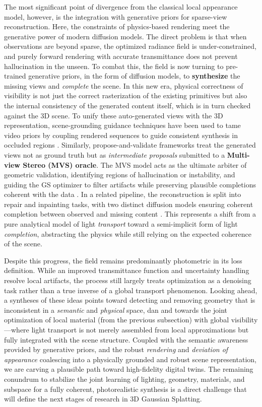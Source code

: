 \documentclass[11pt,a4paper]{article}
\begin{document}
The most significant point of divergence from the classical local appearance model, however, is the integration with generative priors for sparse-view reconstruction. Here, the constraints of physics-based rendering meet the generative power of modern diffusion models. The direct problem is that when observations are beyond sparse, the optimized radiance field is under-constrained, and purely forward rendering with accurate transmittance does not prevent hallucination in the unseen. To combat this, the field is now turning to pre-trained generative priors, in the form of diffusion models, to \textbf{synthesize} the missing views and \emph{complete} the scene. In this new era, physical correctness of visibility is not just the correct rasterization of the existing primitives but also the internal consistency of the generated content itself, which is in turn checked against the 3D scene. To unify these auto-generated views with the 3D representation, scene-grounding guidance techniques have been used to tame video priors by coupling rendered sequences to guide consistent synthesis in occluded regions \cite{arxiv:2503.05082v1}. Similarly, propose-and-validate frameworks treat the generated views not as ground truth but as \emph{intermediate proposals} submitted to a \textbf{Multi-view Stereo (MVS) oracle}. The MVS model acts as the ultimate arbiter of geometric validation, identifying regions of hallucination or instability, and guiding the GS optimizer to filter artifacts while preserving plausible completions coherent with the data \cite{arxiv:2509.23258v2}. In a related pipeline, the reconstruction is split into repair and inpainting tasks, with two distinct diffusion models ensuring coherent completion between observed and missing content \cite{arxiv:2503.10860v2}. This represents a shift from a pure analytical model of light \emph{transport} toward a semi-implicit form of light \emph{completion}, abstracting the physics while still relying on the expected coherence of the scene.

Despite this progress, the field remains predominantly photometric in its loss definition. While an improved transmittance function and uncertainty handling resolve local artifacts, the process still largely treats optimization as a denoising task rather than a true inverse of a global transport phenomenon. Looking ahead, a syntheses of these ideas points toward detecting and removing geometry that is inconsistent in a \emph{semantic} and \emph{physical} space, dan and towards the joint optimization of local material (from the previous subsection) with global visibility---where light transport is not merely assembled from local approximations but fully integrated with the scene structure. Coupled with the semantic awareness provided by generative priors, and the robust \emph{rendering} and \emph{deviation of appearance} coalescing into a physically grounded and robust scene representation, we are carving a plausible path toward high-fidelity digital twins. The remaining conundrum to stabilize the joint learning of lighting, geometry, materials, and subspace for a fully coherent, photorealistic synthesis is a direct challenge that will define the next stages of research in 3D Gaussian Splatting.
\end{document}
